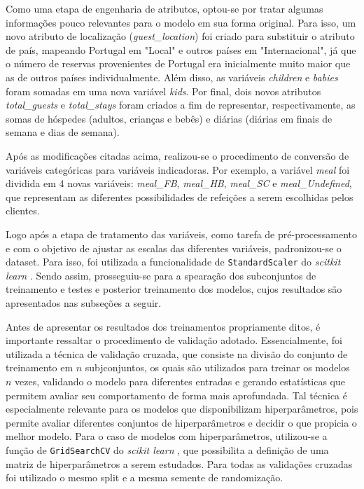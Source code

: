 \documentclass{homework}
\begin{document}
Como uma etapa de engenharia de atributos, optou-se por tratar algumas informações pouco relevantes para o modelo em sua
forma original. Para isso, um novo atributo de localização (\textit{guest\_location}) foi criado para substituir o
atributo de país, mapeando Portugal em "Local" e outros países em "Internacional", já que o número de reservas
provenientes de Portugal era inicialmente muito maior que as de outros países individualmente. Além disso, as variáveis
\textit{children} e \textit{babies} foram somadas em uma nova variável \textit{kids}. Por final, dois novos atributos
\textit{total\_guests} e \textit{total\_stays} foram criados a fim de representar, respectivamente, as somas de hóspedes
(adultos, crianças e bebês) e diárias (diárias em finais de semana e dias de semana).

Após as modificações citadas acima, realizou-se o procedimento de conversão de variáveis categóricas para variáveis
indicadoras. Por exemplo, a variável \textit{meal} foi dividida em 4 novas variáveis: \textit{meal\_FB}, \textit{meal\_HB},
\textit{meal\_SC} e \textit{meal\_Undefined}, que representam as diferentes possibilidades de refeições a serem
escolhidas pelos clientes.

Logo após a etapa de tratamento das variáveis, como tarefa de pré-processamento e com o objetivo de ajustar as escalas
das diferentes variáveis, padronizou-se o dataset. Para isso, foi utilizada a funcionalidade de \texttt{StandardScaler}
do \textit{scitkit learn} \cite{standard_scaler}. Sendo assim, prosseguiu-se para a spearação dos subconjuntos de
treinamento e testes e posterior treinamento dos modelos, cujos resultados são apresentados nas subseções a seguir.

Antes de apresentar os resultados dos treinamentos propriamente ditos, é importante ressaltar o procedimento de
validação adotado. Essencialmente, foi utilizada a técnica de validação cruzada, que consiste na divisão do conjunto de
treinamento em $n$ subjconjuntos, os quais são utilizados para treinar os modelos $n$ vezes, validando o modelo para
diferentes entradas e gerando estatísticas que permitem avaliar seu comportamento de forma mais aprofundada. Tal técnica
é especialmente relevante para os modelos que disponibilizam hiperparâmetros, pois permite avaliar diferentes conjuntos
de hiperparâmetros e decidir o que propicia o melhor modelo. Para o caso de modelos com hiperparâmetros, utilizou-se a
função de \texttt{GridSearchCV} do \textit{scikit learn} \cite{grid_search_cv}, que possibilita a definição de uma
matriz de hiperparâmetros a serem estudados. Para todas as validações cruzadas foi utilizado o mesmo split e a mesma
semente de randomização.
\end{document}
